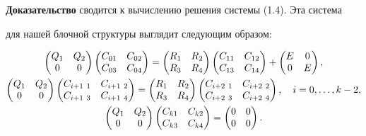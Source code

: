  


{\bf Доказательство} сводится к вычислению решения системы (1.4). Эта система 


для нашей блочной структуры выглядит следующим образом: 


\begin{gather} 


\begin{pmatrix}Q_1 & Q_2 \\ 0 & 0 \end{pmatrix} 


\begin{pmatrix}C_{01} & C_{02} \\ C_{03} & C_{04} \end{pmatrix}= 


\begin{pmatrix}R_1 & R_2 \\ R_3 & R_4 \end{pmatrix} 


\begin{pmatrix}C_{11} & C_{12} \\ C_{13} & C_{14} \end{pmatrix}+ 


\begin{pmatrix}E & 0 \\ 0 & E \end{pmatrix},\notag\\ 


% 


\begin{pmatrix}Q_1 & Q_2 \\ 0 & 0 \end{pmatrix} 


\begin{pmatrix}C_{i+1\ 1} & C_{i+1\ 2} \\ 


C_{i+1\ 3} & C_{i+1\ 4}\end{pmatrix}= 


\begin{pmatrix}R_1 & R_2 \\ R_3 & R_4 \end{pmatrix} 


\begin{pmatrix}C_{i+2\ 1} & C_{i+2\ 2}\\ 


C_{i+2\ 3} & C_{i+2\ 4} \end{pmatrix},\quad i=0,\dotsc,k-2,\\ 


% 


\begin{pmatrix}Q_1 & Q_2 \\ 0 & 0 \end{pmatrix} 


\begin{pmatrix}C_{k1} & C_{k2} \\ C_{k3} & C_{k4} \end{pmatrix}= 


\begin{pmatrix}0 & 0 \\ 0 & 0 \end{pmatrix}.\notag 


\end{gather} 


